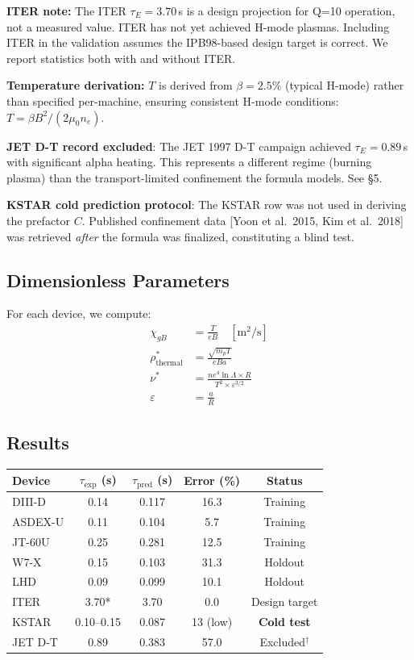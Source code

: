 \documentclass[11pt,letterpaper]{article}
\newcommand{\tauE}{\tau_E}
\newcommand{\chiGB}{\chi_{gB}}
\newcommand{\rhotherm}{\rho_{\text{thermal}}^*}
\newcommand{\nustar}{\nu^*}
\begin{document}
\noindent *\textbf{ITER note:} The ITER $\tauE = 3.70$\,s is a design projection for Q=10 operation, not a measured value. ITER has not yet achieved H-mode plasmas. Including ITER in the validation assumes the IPB98-based design target is correct. We report statistics both with and without ITER.

\textbf{Temperature derivation:} $T$ is derived from $\beta = 2.5\%$ (typical H-mode) rather than specified per-machine, ensuring consistent H-mode conditions: $T = \beta B^2 / (2\mu_0 n_e)$.

\textbf{JET D-T record excluded}: The JET 1997 D-T campaign achieved $\tauE = 0.89$\,s with significant alpha heating. This represents a different regime (burning plasma) than the transport-limited confinement the formula models. See \S5.

\textbf{KSTAR cold prediction protocol}: The KSTAR row was not used in deriving the prefactor $C$. Published confinement data [Yoon et al.\ 2015, Kim et al.\ 2018] was retrieved \textit{after} the formula was finalized, constituting a blind test.

\subsection{Dimensionless Parameters}

For each device, we compute:
\begin{align}
\chiGB &= \frac{T}{eB} \quad [\text{m}^2/\text{s}] \\[0.8em]
\rhotherm &= \frac{\sqrt{m_p T}}{eBa} \\[0.8em]
\nustar &= \frac{n e^4 \ln\Lambda \times R}{T^2 \times \varepsilon^{3/2}} \\[0.8em]
\varepsilon &= \frac{a}{R}
\end{align}

\subsection{Results}

\begin{center}
\begin{tabular}{lcccc}
\toprule
\textbf{Device} & $\tau_{\exp}$ (s) & $\tau_{\text{pred}}$ (s) & \textbf{Error (\%)} & \textbf{Status} \\
\midrule
DIII-D & 0.14 & 0.117 & 16.3 & Training \\
ASDEX-U & 0.11 & 0.104 & 5.7 & Training \\
JT-60U & 0.25 & 0.281 & 12.5 & Training \\
W7-X & 0.15 & 0.103 & 31.3 & Holdout \\
LHD & 0.09 & 0.099 & 10.1 & Holdout \\
ITER & 3.70* & 3.70 & 0.0 & Design target \\
KSTAR & 0.10--0.15 & 0.087 & 13 (low) & \textbf{Cold test} \\
JET D-T & 0.89 & 0.383 & 57.0 & Excluded$^\dagger$ \\
\bottomrule
\end{tabular}
\end{center}
\end{document}
